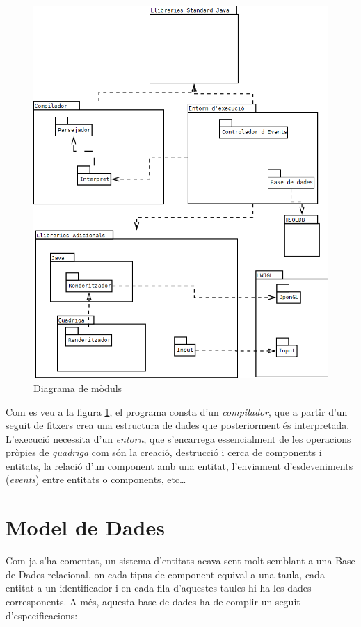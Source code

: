 \begin{figure}
  \includegraphics[width=1\linewidth]{./img/Moduls.png}
  \caption{Diagrama de mòduls \label{fig:DiagramaDeModuls}}
\end{figure}

Com es veu a la figura \ref{fig:DiagramaDeModuls}, el programa consta d'un {\em compilador}, que a partir d'un seguit de fitxers crea una estructura de dades que posteriorment és interpretada. L'execució necessita d'un {\em entorn}, que s'encarrega essencialment de les operacions pròpies de {\em quadriga} com són la creació, destrucció i cerca de components i entitats, la relació d'un component amb una entitat, l'enviament d'esdeveniments ({\em events}) entre entitats o components, etc\ldots

\section{Model de Dades}

Com ja s'ha comentat, un sistema d'entitats acava sent molt semblant a una Base de Dades relacional, on cada tipus de component equival a una taula, cada entitat a un identificador i en cada fila d'aquestes taules hi ha les dades corresponents. A més, aquesta base de dades ha de complir un seguit d'especificacions:

